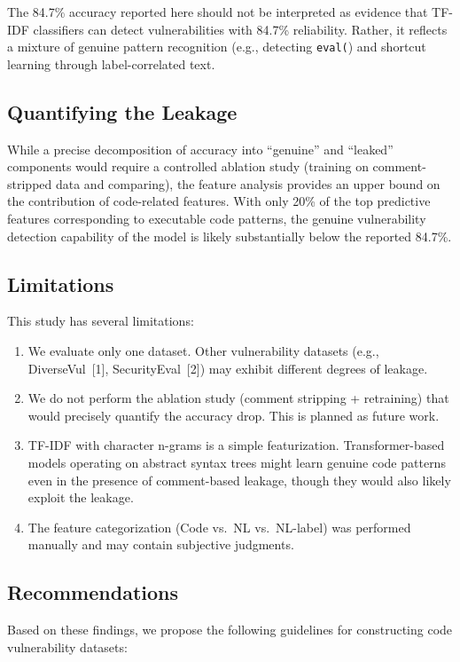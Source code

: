 \documentclass[11pt,a4paper]{article}
\begin{document}
The 84.7\% accuracy reported here should not be interpreted as evidence that TF-IDF classifiers can detect vulnerabilities with 84.7\% reliability. Rather, it reflects a mixture of genuine pattern recognition (e.g., detecting \texttt{eval(}) and shortcut learning through label-correlated text.

\subsection{Quantifying the Leakage}

While a precise decomposition of accuracy into ``genuine'' and ``leaked'' components would require a controlled ablation study (training on comment-stripped data and comparing), the feature analysis provides an upper bound on the contribution of code-related features. With only 20\% of the top predictive features corresponding to executable code patterns, the genuine vulnerability detection capability of the model is likely substantially below the reported 84.7\%.

\subsection{Limitations}

This study has several limitations:
\begin{enumerate}
    \item We evaluate only one dataset. Other vulnerability datasets (e.g., DiverseVul~[1], SecurityEval~[2]) may exhibit different degrees of leakage.
    \item We do not perform the ablation study (comment stripping + retraining) that would precisely quantify the accuracy drop. This is planned as future work.
    \item TF-IDF with character n-grams is a simple featurization. Transformer-based models operating on abstract syntax trees might learn genuine code patterns even in the presence of comment-based leakage, though they would also likely exploit the leakage.
    \item The feature categorization (Code vs.\ NL vs.\ NL-label) was performed manually and may contain subjective judgments.
\end{enumerate}

\subsection{Recommendations}

Based on these findings, we propose the following guidelines for constructing code vulnerability datasets:
\end{document}
